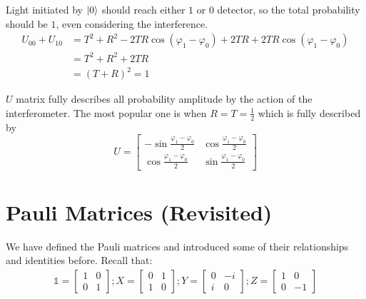 \documentclass[12pt]{article}
\begin{document}
\begin{proposition}
Light initiated by $\Ket{0}$ should reach either $1$ or $0$ detector, so the total probability should be $1$, even considering the interference.
$$
\begin{aligned}
U_{00} + U_{10}
    &= T^2 + R^2 - 2TR\cos(\varphi_1 - \varphi_0) +  2TR + 2TR\cos(\varphi_1-\varphi_0)\\
    &= T^2 + R^2 +  2TR\\
    &= (T+R)^2 = 1
\end{aligned}
$$
\end{proposition}

\begin{remark}
$U$ matrix fully describes all probability amplitude by the action of the interferometer. The most popular one is when $R = T = \frac{1}{2}$ which is fully described by $$
U = \begin{bmatrix}
-\sin \frac{\varphi_1 - \varphi_0}{2} & \cos\frac{\varphi_1 - \varphi_0}{2}\\
\cos\frac{\varphi_1 - \varphi_0}{2} & \sin \frac{\varphi_1 - \varphi_0}{2}
\end{bmatrix}
$$
\end{remark}

\section{Pauli Matrices (Revisited)}
We have defined the Pauli matrices and introduced some of their relationships and identities before. Recall that: $$
\begin{aligned}
\mathbb{1} = \begin{bmatrix}
        1 & 0\\
        0 & 1
    \end{bmatrix};
X = \begin{bmatrix}
        0 & 1\\
        1 & 0
    \end{bmatrix};
Y = \begin{bmatrix}
        0 & -i\\
        i & 0
    \end{bmatrix};
Z = \begin{bmatrix}
        1 & 0\\
        0 & -1
    \end{bmatrix}
\end{aligned}
$$
\end{document}
